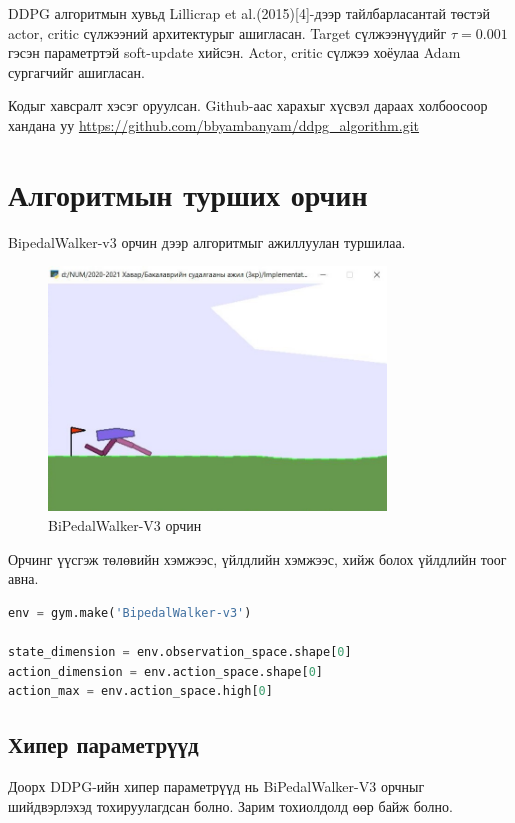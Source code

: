 \documentclass[12pt,A4]{report}
\begin{document}
DDPG алгоритмын хувьд Lillicrap et al.(2015)[4]-дээр тайлбарласантай төстэй actor, critic сүлжээний архитектурыг ашигласан. Target сүлжээнүүдийг $\tau=0.001$ гэсэн параметртэй soft-update хийсэн. Actor, critic сүлжээ хоёулаа Adam сургагчийг ашигласан.

Кодыг хавсралт хэсэг оруулсан. Github-аас харахыг хүсвэл дараах холбоосоор хандана уу \url{https://github.com/bbyambanyam/ddpg_algorithm.git}

\section{Алгоритмын турших орчин}

BipedalWalker-v3 орчин дээр алгоритмыг ажиллуулан туршилаа.

\begin{figure}[H]
\centering
\includegraphics[width=0.8\textwidth]{./images/bipedalwalker}
\caption{BiPedalWalker-V3 орчин}
\end{figure}

Орчинг үүсгэж төлөвийн хэмжээс, үйлдлийн хэмжээс, хийж болох үйлдлийн тоог авна.

\begin{lstlisting}[language=Python, caption=Орчин үүсгэх, frame=single]
env = gym.make('BipedalWalker-v3')

state_dimension = env.observation_space.shape[0]
action_dimension = env.action_space.shape[0]
action_max = env.action_space.high[0]
\end{lstlisting}

\subsection{Хипер параметрүүд}

Доорх DDPG-ийн хипер параметрүүд нь BiPedalWalker-V3 орчныг шийдвэрлэхэд тохируулагдсан болно. Зарим тохиолдолд өөр байж болно.
\end{document}
